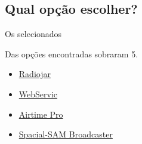 \subsection{Qual opção escolher?}\label{qual-opuxe7uxe3o-escolher}

\begin{frame}{Os selecionados}

Das opções encontradas sobraram 5.

\begin{itemize}
\tightlist
\item
  \href{https://www.radiojar.com}{Radiojar}
\item
  \href{http://host.webservic.com.br/V3/streaming_whmsonic.php}{WebServic}
\item
  \href{https://www.airtime.pro/pricing/}{Airtime Pro}
\item
  \href{https://spacial.com/pricing/}{Spacial-SAM Broadcaster}
\end{itemize}

\end{frame}

